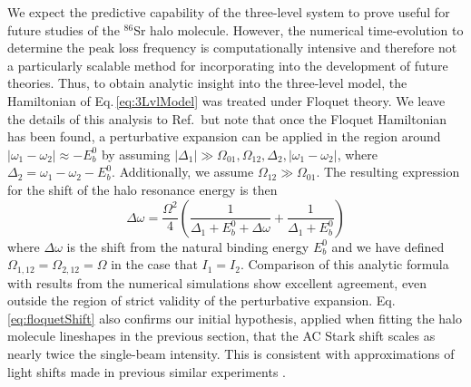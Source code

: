 We expect the predictive capability of the three-level system to prove useful for future studies of the $^{86}$Sr halo molecule.
However, the numerical time-evolution to determine the peak loss frequency is computationally intensive and therefore not a particularly scalable method for incorporating into the development of future theories.
Thus, to obtain analytic insight into the three-level model, the Hamiltonian of Eq.\,\ref{eq:3LvlModel} was treated under Floquet theory.
We leave the details of this analysis to Ref.\,\cite{Kon2018} but note that once the Floquet Hamiltonian has been found, a perturbative expansion can be applied in the region around $|\omega_1 - \omega_2| \approx -E_b^0$ by assuming $|\Delta_1| \gg \Omega_{01}, \Omega_{12}, \Delta_2, |\omega_1 - \omega_2|$, where $\Delta_2 = \omega_1 - \omega_2 - E_b^0$.
Additionally, we assume $\Omega_{12} \gg \Omega_{01}$.
The resulting expression for the shift of the halo resonance energy is then
\begin{equation} \label{eq:floquetShift}
	\Delta \omega = \frac{\Omega^2}{4} \left( \frac{1}{\Delta_1 + E_b^0 + \Delta\omega} + \frac{1}{\Delta_1 + E_b^0} \right)
\end{equation}
where $\Delta\omega$ is the shift from the natural binding energy $E_b^0$ and we have defined $\Omega_{1,12}=\Omega_{2,12}=\Omega$ in the case that $I_1=I_2$.
Comparison of this analytic formula with results from the numerical simulations show excellent agreement, even outside the region of strict validity of the perturbative expansion.
Eq.\,\ref{eq:floquetShift} also confirms our initial hypothesis, applied when fitting the halo molecule lineshapes in the previous section, that the AC Stark shift scales as nearly twice the single-beam intensity.
This is consistent with approximations of light shifts made in previous similar experiments \cite{Wynar2000,Tojo2006}.

